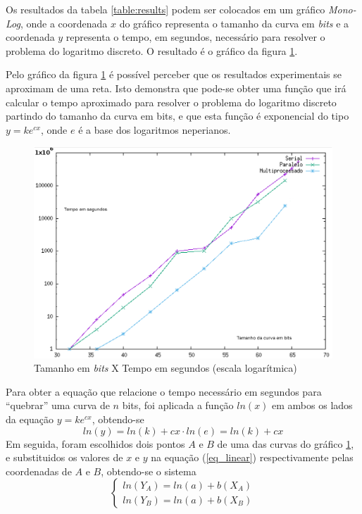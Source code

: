 Os resultados da tabela \ref{table:results} podem ser colocados em um gráfico \textit{Mono-Log}, onde a coordenada $x$ do gráfico representa o tamanho da curva em \textit{bits} e a coordenada $y$ representa o tempo, em segundos, necessário para resolver o problema do logaritmo discreto. O resultado é o gráfico da figura \ref{grafico1}.

Pelo gráfico da figura \ref{grafico1} é possível perceber que os resultados experimentais se aproximam de uma reta. Isto demonstra que pode-se obter uma função que irá calcular o tempo aproximado para resolver o problema do logaritmo discreto partindo do tamanho da curva em bits, e que esta função é exponencial do tipo \(y = ke^{cx}\), onde $e$ é a base dos logaritmos neperianos.

\begin{figure}[h]
\centering
\includegraphics[scale=0.6, bb=0 0 515 478]{figuras/grafico1.eps}
\caption{Tamanho em \textit{bits} X Tempo em segundos (escala logarítmica)}
\label{grafico1}
\end{figure}

Para obter a equação que relacione o tempo necessário em segundos para ``quebrar'' uma curva de $n$ bits, foi aplicada a função \(ln(x)\) em ambos os lados da equação \(y = ke^{cx}\), obtendo-se
\begin{equation} \label{eq_linear}
	ln(y) = ln(k) + cx\cdot ln(e) = ln(k) + cx
\end{equation}
Em seguida, foram escolhidos dois pontos \(A\) e \(B\) de uma das curvas do gráfico \ref{grafico1}, e substituidos os valores de \(x\) e \(y\) na equação (\ref{eq_linear}) respectivamente pelas coordenadas de \(A\) e \(B\), obtendo-se o sistema
\begin{equation*}
\left\{ \begin{array}{c}
ln(Y_A) = ln(a) + b(X_A)\\
ln(Y_B) = ln(a) + b(X_B)
\end{array}
\right.
\end{equation*}

